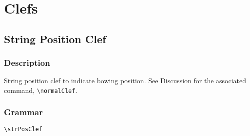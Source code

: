 

\chapter {Clefs}


\section {String Position Clef}
\hfill
{}
\hfill

\subsection{Description}
String position clef to indicate bowing position. See Discussion for the associated command, \verb|\normalClef|.

\subsection{Grammar}
\begin{verbatim}
\strPosClef 
\end{verbatim}
